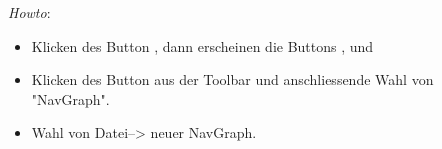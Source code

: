 \emph{Howto}:

\begin{itemize}
\item Klicken des Button , dann
  erscheinen die Buttons ,
   und
\item Klicken des Button  aus der Toolbar
  und anschliessende Wahl von "NavGraph".
\item Wahl von Datei--> neuer NavGraph.
\end{itemize}